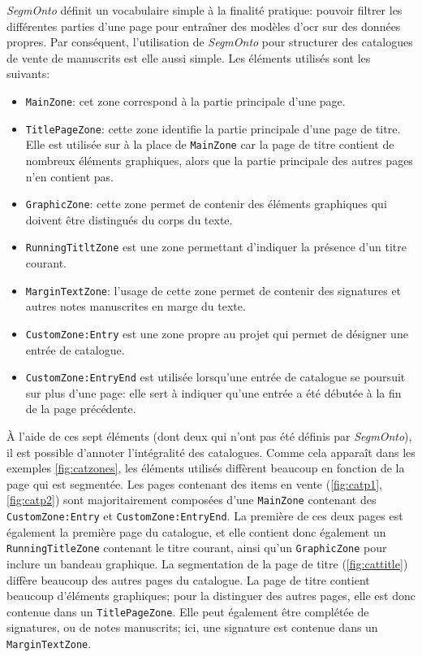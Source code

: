 \textit{SegmOnto} définit un vocabulaire simple à la finalité pratique: pouvoir filtrer les différentes parties d'une page pour entraîner des modèles d'\gls{ocr} sur des données propres. Par conséquent, l'utilisation de \textit{SegmOnto} pour structurer des catalogues de vente de manuscrits est elle aussi simple. Les éléments utilisés sont les suivants:

\begin{itemize}
	\item \texttt{MainZone}: cet zone correspond à la partie principale d'une page.
	\item \texttt{TitlePageZone}: cette zone identifie la partie principale d'une page de titre. Elle est utilisée sur à la place de \texttt{MainZone} car la page de titre contient de nombreux éléments graphiques, alors que la partie principale des autres pages n'en contient pas.
	\item \texttt{GraphicZone}: cette zone permet de contenir des éléments graphiques qui doivent être distingués du corps du texte.
	\item \texttt{RunningTitltZone} est une zone permettant d'indiquer la présence d'un titre courant.
	\item \texttt{MarginTextZone}: l'usage de cette zone permet de contenir des signatures et autres notes manuscrites en marge du texte.
	\item \texttt{CustomZone:Entry} est une zone propre au projet \mssktb{} qui permet de désigner une entrée de catalogue.
	\item \texttt{CustomZone:EntryEnd} est utilisée lorsqu'une entrée de catalogue se poursuit sur plus d'une page: elle sert à indiquer qu'une entrée a été débutée à la fin de la page précédente.
\end{itemize}

À l'aide de ces sept éléments (dont deux qui n'ont pas été définis par \textit{SegmOnto}), il est possible d'annoter l'intégralité des catalogues. Comme cela apparaît dans les exemples \ref{fig:catzones}, les éléments utilisés diffèrent beaucoup en fonction de la page qui est segmentée. Les pages contenant des items en vente (\ref{fig:catp1}, \ref{fig:catp2}) sont majoritairement composées d'une \texttt{MainZone} contenant des \texttt{CustomZone:Entry} et \texttt{CustomZone:EntryEnd}. La première de ces deux pages est également la première page du catalogue, et elle contient donc également un \texttt{RunningTitleZone} contenant le titre courant, ainsi qu'un \texttt{GraphicZone} pour inclure un bandeau graphique. La segmentation de la page de titre (\ref{fig:cattitle}) diffère beaucoup des autres pages du catalogue. La page de titre contient beaucoup d'éléments graphiques; pour la distinguer des autres pages, elle est donc contenue dans un \texttt{TitlePageZone}. Elle peut également être complétée de signatures, ou de notes manuscrits; ici, une signature est contenue dans un \texttt{MarginTextZone}.

